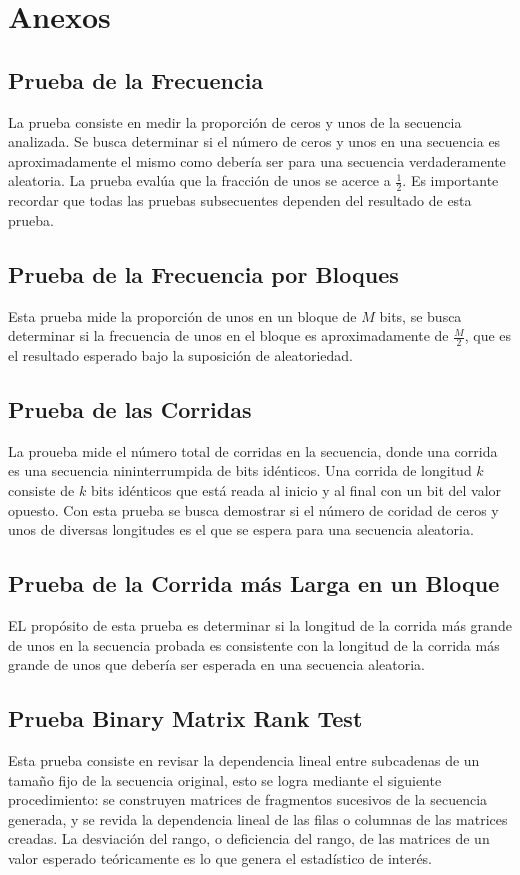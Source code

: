 \chapter*{Anexos}


\section*{Prueba de la Frecuencia}
La prueba consiste en medir la proporción de ceros y unos de la secuencia analizada. Se busca determinar si el número de ceros y unos en una secuencia es aproximadamente el mismo como debería ser para una secuencia verdaderamente aleatoria. La prueba evalúa que la fracción de unos  se acerce a $\frac{1}{2}$. Es importante recordar que todas las pruebas subsecuentes dependen del resultado de esta prueba.


\section*{Prueba de la Frecuencia por Bloques}
Esta prueba mide la proporción de unos en un bloque de $M$ bits, se busca determinar si la frecuencia de unos en el bloque es aproximadamente de $\frac{M}{2}$, que es el resultado esperado bajo la suposición de aleatoriedad. 

\section*{Prueba de las Corridas}
La proueba mide el número total de corridas en la secuencia, donde una corrida es una secuencia nininterrumpida de bits idénticos. Una corrida de longitud $k$ consiste de $k$ bits idénticos que está reada al inicio y al final con un bit del valor opuesto. Con esta prueba se busca demostrar si el número de coridad de ceros y unos de diversas longitudes es el que se espera para una secuencia aleatoria.

\section*{Prueba de la Corrida más Larga en un Bloque}

EL propósito de esta prueba es determinar si la longitud de la corrida más grande de unos en la secuencia probada es consistente con la longitud de la corrida más grande de unos que debería ser esperada en una secuencia aleatoria.




\section*{Prueba Binary Matrix Rank Test}
Esta prueba consiste en revisar la dependencia lineal entre subcadenas de un tamaño fijo de la secuencia original, esto se logra mediante el siguiente procedimiento: se construyen matrices de fragmentos sucesivos de la secuencia generada, y se revida la dependencia lineal de las filas o columnas de las matrices creadas. La desviación del rango, o deficiencia del rango, de las matrices de un valor esperado teóricamente es lo que genera el estadístico de interés.

